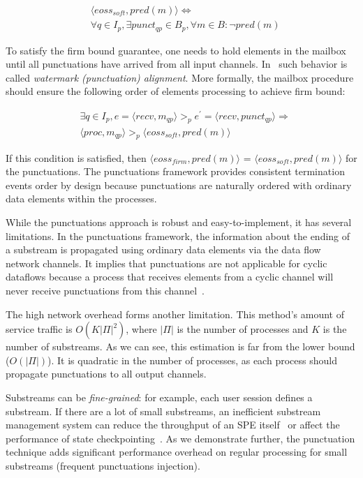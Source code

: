 \begin{align*}
& \langle eoss_{soft}, pred(m)\rangle \Longleftrightarrow \\ 
& \forall q \in I_p, \exists punct_{qp} \in B_p, \forall m\in B : \neg pred(m)
\end{align*}

To satisfy the firm bound guarantee, one needs to hold elements in the mailbox until all punctuations have arrived from all input channels. In~\cite{Carbone:2017:SMA:3137765.3137777} such behavior is called {\em watermark (punctuation) alignment}. More formally, the mailbox procedure should ensure the following order of elements processing to achieve firm bound:

\begin{align*}
& \exists q \in I_p, e = \langle recv,m_{qp} \rangle >_p e^{'} = \langle recv,punct_{qp}\rangle \Longrightarrow \\ 
& \langle proc, m_{qp}\rangle >_p \langle eoss_{soft}, pred(m)\rangle
\end{align*}

If this condition is satisfied, then $\langle eoss_{firm}, pred(m)\rangle$ = $\langle eoss_{soft}, pred(m)\rangle$ for the punctuations. The punctuations framework provides consistent termination events order by design because punctuations are naturally ordered with ordinary data elements within the processes.

While the punctuations approach is robust and easy-to-implement, it has several limitations. In the punctuations framework, the information about the ending of a substream is propagated using ordinary data elements via the data flow network channels. It implies that punctuations are not applicable for cyclic dataflows because a process that receives elements from a cyclic channel will never receive punctuations from this channel~\cite{carbone2018scalable}.

The high network overhead forms another limitation. This method's amount of service traffic is $O(K|\Pi|^2)$, where $|\Pi|$ is the number of processes and $K$ is the number of substreams. As we can see, this estimation is far from the lower bound ($O(|\Pi|)$). It is quadratic in the number of processes, as each process should propagate punctuations to all output channels. 

Substreams can be {\em fine-grained}: for example, each user session defines a substream. If there are a lot of small substreams, an inefficient substream management system can reduce the throughput of an SPE itself~\cite{Li:2008:OPN:1453856.1453890} or affect the performance of state checkpointing~\cite{zhang2021research}. As we demonstrate further, the punctuation technique adds significant performance overhead on regular processing for small substreams (frequent punctuations injection).